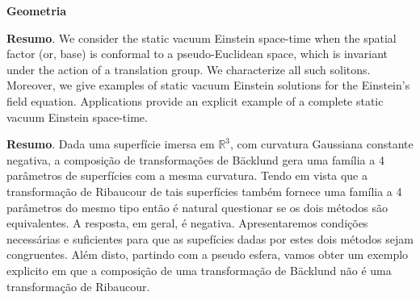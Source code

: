 
\pagestyle{fancy}

\lhead{}
\rhead{}


\renewcommand{\headrulewidth}{0.4pt}
\renewcommand{\footrulewidth}{0.4pt}


\begin{center}
	\huge{{\bf Geometria}}
	\vspace{1cm}
\end{center}



	
	
	\noindent\textbf{Resumo}.\label{bln} 
	We consider the static vacuum Einstein space-time when the spatial factor (or, base) is conformal to a pseudo-Euclidean space, which is invariant under the action of a translation group. We characterize all such solitons. Moreover, we give examples of static vacuum Einstein solutions for the Einstein's field equation. Applications provide an explicit example of a complete static vacuum Einstein space-time.
	
	
	\vspace{24pt}

	
	
	\noindent\textbf{Resumo}.\label{cg} 
	Dada uma superfície imersa em $\mathbb{R}^3$, com curvatura Gaussiana constante negativa, a composição de transformações de B\"{a}cklund gera uma família a 4 parâmetros de superfícies com a mesma curvatura. Tendo em vista que a transformação de Ribaucour de tais superfícies também fornece uma família a 4 parâmetros do mesmo tipo então é natural questionar se os dois métodos são equivalentes. A resposta, em geral, é negativa. Apresentaremos condições necessárias e suficientes para que as supefícies dadas por estes dois métodos sejam congruentes.  Além disto, partindo com a pseudo esfera, vamos obter um exemplo explicito em que a composição de uma transformação de B\"{a}cklund não é uma transformação de Ribaucour. 
	
